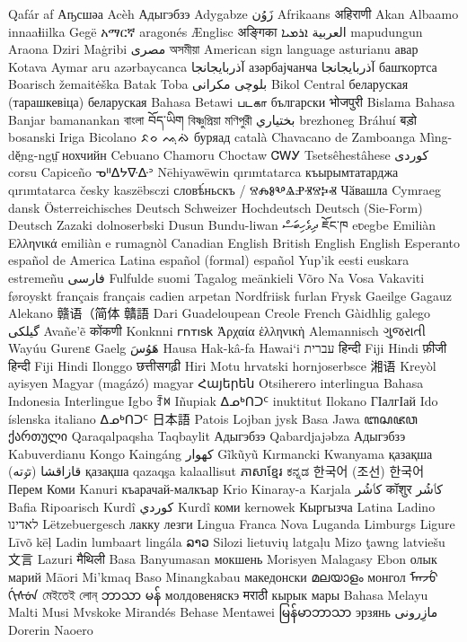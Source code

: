 \bgroup
\obeylines
\pan
Qafár af
Аҧсшәа
Acèh
Адыгэбзэ
Adygabze
زَوُن
Afrikaans
अहिराणी
Akan
Albaamo innaaɬiilka
Gegë
አማርኛ
aragonés
Ænglisc
अङ्गिका
العربية
ܐܪܡܝܐ
mapudungun
Araona
Dziri
Maġribi
مصرى
অসমীয়া
American sign language
asturianu
авар
Kotava
Aymar aru
azərbaycanca
آذربايجانجا
азәрбајҹанҹа
آذربايجانجا
башҡортса
Boarisch
žemaitėška
Batak Toba
بلوچی مکرانی
Bikol Central
беларуская (тарашкевіца)
беларуская
Bahasa Betawi
படகா
български
भोजपुरी
Bislama
Bahasa Banjar
bamanankan
বাংলা
བོད་ཡིག
বিষ্ণুপ্রিয়া মণিপুরী
بختياري
brezhoneg
Bráhuí
बड़ो
bosanski
Iriga Bicolano
ᨅᨔ ᨕᨘᨁᨗ
буряад
català
Chavacano de Zamboanga
Mìng-dĕ̤ng-ngṳ̄
нохчийн
Cebuano
Chamoru
Choctaw
ᏣᎳᎩ
Tsetsêhestâhese
کوردی
corsu
Capiceño
ᓀᐦᐃᔭᐍᐏᐣ
Nēhiyawēwin
qırımtatarca
къырымтатарджа
qırımtatarca
česky
kaszëbsczi
словѣ́ньскъ / ⰔⰎⰑⰂⰡⰐⰠⰔⰍⰟ
Чӑвашла
Cymraeg
dansk
Österreichisches Deutsch
Schweizer Hochdeutsch
Deutsch (Sie-Form)
Deutsch
Zazaki
dolnoserbski
Dusun Bundu-liwan
ދިވެހިބަސް
ཇོང་ཁ
eʋegbe
Emiliàn
Ελληνικά
emiliàn e rumagnòl
Canadian English
British English
English
Esperanto
español de America Latina
español (formal)
español
Yup'ik
eesti
euskara
estremeñu
فارسی
Fulfulde
suomi
Tagalog
meänkieli
Võro
Na Vosa Vakaviti
føroyskt
français
français cadien
arpetan
Nordfriisk
furlan
Frysk
Gaeilge
Gagauz
Alekano
赣语（简体
贛語
Dari
Guadeloupean Creole French
Gàidhlig
galego
گیلکی
Avañe'ẽ
कोंकणी
Konknni
𐌲𐌿𐍄𐌹𐍃𐌺
Ἀρχαία ἑλληνικὴ
Alemannisch
ગુજરાતી
Wayúu
Gurenɛ
Gaelg
هَوُسَ
Hausa
Hak-kâ-fa
Hawai`i
עברית
हिन्दी
Fiji Hindi
फ़ीजी हिन्दी
Fiji Hindi
Ilonggo
छत्तीसगढ़ी
Hiri Motu
hrvatski
hornjoserbsce
湘语
Kreyòl ayisyen
Magyar (magázó)
magyar
Հայերեն
Otsiherero
interlingua
Bahasa Indonesia
Interlingue
Igbo
ꆇꉙ
Iñupiak
ᐃᓄᒃᑎᑐᑦ
inuktitut
Ilokano
ГӀалгӀай
Ido
íslenska
italiano
ᐃᓄᒃᑎᑐᑦ
日本語
Patois
Lojban
jysk
Basa Jawa
ꦧꦱꦗꦮ
ქართული
Qaraqalpaqsha
Taqbaylit
Адыгэбзэ
Qabardjajəbza
Адыгэбзэ
Kabuverdianu
Kongo
Kaingáng
کھوار
Gĩkũyũ
Kırmancki
Kwanyama
қазақша
قازاقشا (تٶتە)
қазақша
qazaqşa
kalaallisut
ភាសាខ្មែរ
ಕನ್ನಡ
한국어 (조선)
한국어
Перем Коми
Kanuri
къарачай-малкъар
Krio
Kinaray-a
Karjala
کٲشُر
कॉशुर
کٲشُر
Bafia
Ripoarisch
Kurdî
كوردي
Kurdî
коми
kernowek
Кыргызча
Latina
Ladino
לאדינו
Lëtzebuergesch
лакку
лезги
Lingua Franca Nova
Luganda
Limburgs
Ligure
Līvõ kēļ
Ladin
lumbaart
lingála
ລາວ
Silozi
lietuvių
latgaļu
Mizo ţawng
latviešu
文言
Lazuri
मैथिली
Basa Banyumasan
мокшень
Morisyen
Malagasy
Ebon
олык марий
Māori
Mi'kmaq
Baso Minangkabau
македонски
മലയാളം
монгол
ᠮᠠᠨᠵᡠ ᡤᡳᠰᡠᠨ
মেইতেই লোন্
ဘာသာ မန်
молдовеняскэ
मराठी
кырык мары
Bahasa Melayu
Malti
Musi
Mvskoke
Mirandés
Behase Mentawei
မြန်မာဘာသာ
эрзянь
مازِرونی
Dorerin Naoero
